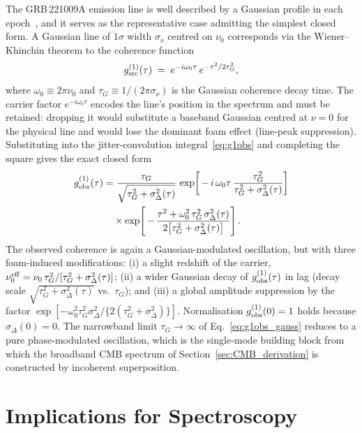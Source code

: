\documentclass[aps,prd,onecolumn,amsmath,amssymb]{revtex4-2}
\begin{document}
The GRB\,221009A emission line is well described by a Gaussian profile
in each epoch~\cite{YQZhang2024}, and it serves as the representative
case admitting the simplest closed form.
A Gaussian line of $1\sigma$ width $\sigma_\nu$ centred on $\nu_0$
corresponds via the Wiener--Khinchin theorem to the coherence function
\begin{equation}
  g^{(1)}_{\rm src}(\tau) \;=\; e^{-i\omega_0\tau}\,e^{-\tau^2/2\tau_G^2},
  \label{eq:g1src_gauss}
\end{equation}
where $\omega_0 \equiv 2\pi\nu_0$ and $\tau_G \equiv 1/(2\pi\sigma_\nu)$ is the
Gaussian coherence decay time.  The carrier factor $e^{-i\omega_0\tau}$
encodes the line's position in the spectrum and must be retained: dropping
it would substitute a baseband Gaussian centred at $\nu=0$ for the physical
line and would lose the dominant foam effect (line-peak suppression).
Substituting into the jitter-convolution integral~\eqref{eq:g1obs} and
completing the square gives the exact closed form
\begin{align}
  g^{(1)}_{\rm obs}(\tau)
  &= \frac{\tau_G}{\sqrt{\tau_G^2+\sigma_\Delta^2(\tau)}}\,
     \exp\!\left[\,-\,i\,\omega_0\tau\,
       \frac{\tau_G^2}{\tau_G^2+\sigma_\Delta^2(\tau)}\right] \notag\\
  &\quad\times \exp\!\left[\,-\,\frac{\tau^2+\omega_0^2\,
       \tau_G^2\,\sigma_\Delta^2(\tau)}
       {2\bigl[\tau_G^2+\sigma_\Delta^2(\tau)\bigr]}\right].
  \label{eq:g1obs_gauss}
\end{align}
The observed coherence is again a Gaussian-modulated oscillation, but
with three foam-induced modifications: (i) a slight redshift of the
carrier, $\nu_0^{\rm eff} = \nu_0\,\tau_G^2/[\tau_G^2+\sigma_\Delta^2(\tau)]$;
(ii) a wider Gaussian decay of $g^{(1)}_{\rm obs}(\tau)$ in lag (decay
scale $\sqrt{\tau_G^2+\sigma_\Delta^2(\tau)}$ vs.\ $\tau_G$);
and (iii) a global amplitude suppression by the factor
$\exp\!\left[-\omega_0^2\tau_G^2\sigma_\Delta^2/\{2(\tau_G^2+\sigma_\Delta^2)\}\right]$.
Normalisation $g^{(1)}_{\rm obs}(0)=1$ holds because $\sigma_\Delta(0)=0$.
The narrowband limit $\tau_G\to\infty$ of
Eq.~\eqref{eq:g1obs_gauss} reduces to a pure phase-modulated
oscillation, which is the single-mode building block from which the
broadband CMB spectrum of Section~\ref{sec:CMB_derivation} is
constructed by incoherent superposition.

\section{Implications for Spectroscopy}
\label{sec:spec}
\end{document}
